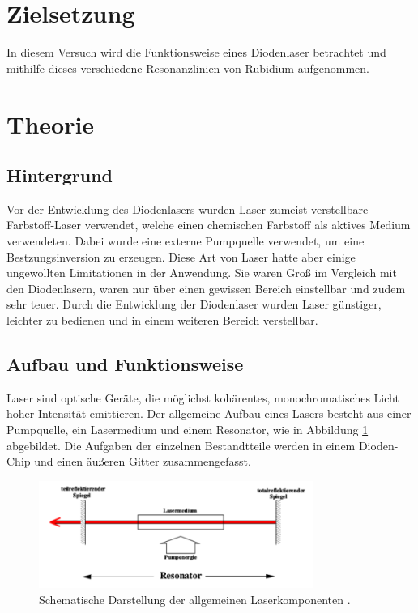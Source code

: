 \section{Zielsetzung}
\label{sec:Zielsetzung}
In diesem Versuch wird die Funktionsweise eines Diodenlaser betrachtet und
mithilfe dieses verschiedene Resonanzlinien von Rubidium aufgenommen.

\section{Theorie}
\label{sec:Theorie}

\subsection{Hintergrund}
Vor der Entwicklung des Diodenlasers wurden Laser zumeist verstellbare Farbstoff-Laser
verwendet, welche einen chemischen Farbstoff als aktives Medium verwendeten.
Dabei wurde eine externe Pumpquelle verwendet, um eine Bestzungsinversion zu
erzeugen. Diese Art von Laser hatte aber einige ungewollten Limitationen in
der Anwendung. Sie waren Groß im Vergleich mit den Diodenlasern, waren nur über
einen gewissen Bereich einstellbar und zudem sehr teuer. Durch die Entwicklung
der Diodenlaser wurden Laser günstiger, leichter zu bedienen und in einem weiteren
Bereich verstellbar.

\subsection{Aufbau und Funktionsweise}
Laser sind optische Geräte, die möglichst kohärentes, monochromatisches Licht
hoher Intensität emittieren.
Der allgemeine Aufbau eines Lasers besteht aus einer Pumpquelle, ein Lasermedium
und einem Resonator, wie in Abbildung \ref{fig:laser} abgebildet.
Die Aufgaben der einzelnen Bestandtteile werden in einem Dioden-Chip und einen
äußeren Gitter zusammengefasst.

\begin{figure}[htb]
  \centering
  \includegraphics[width=0.8\textwidth]{images/V61.pdf}
  \caption{Schematische Darstellung der allgemeinen Laserkomponenten \cite{anleitung2}.}
  \label{fig:laser}
\end{figure}

